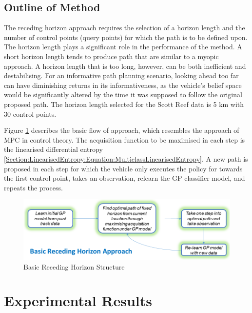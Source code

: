 \documentclass{article}
\begin{document}
		
	\subsection{Outline of Method}

		The receding horizon approach requires the selection of a horizon length and the number of control points (query points) for which the path is to be defined upon. The horizon length plays a significant role in the performance of the method. A short horizon length tends to produce path that are similar to a myopic approach. A horizon length that is too long, however, can be both inefficient and destabilising. For an informative path planning scenario, looking ahead too far can have diminishing returns in its informativeness, as the vehicle's belief space would be significantly altered by the time it was supposed to follow the original proposed path. The horizon length selected for the Scott Reef data is 5 km with 30 control points.
		
		Figure \ref{Figure:Results:RecedingHorizonMethodOutline} describes the basic flow of approach, which resembles the approach of MPC in control theory. The acquisition function to be maximised in each step is the linearised differential entropy \eqref{Section:LinearisedEntropy:Equation:MulticlassLinearisedEntropy}. A new path is proposed in each step for which the vehicle only executes the policy for towards the first control point, takes an observation, relearn the GP classifier model, and repeats the process. 
		
		\begin{figure}[!htbp]
		\centering
			\includegraphics[width = \linewidth]{Figures/receding_horizon_informative_path_planning.png}
		\caption{Basic Receding Horizon Structure}
		\label{Figure:Results:RecedingHorizonMethodOutline}
		\end{figure}
		
\section{Experimental Results}
\label{Section:ExperimentalResults}
\end{document}
